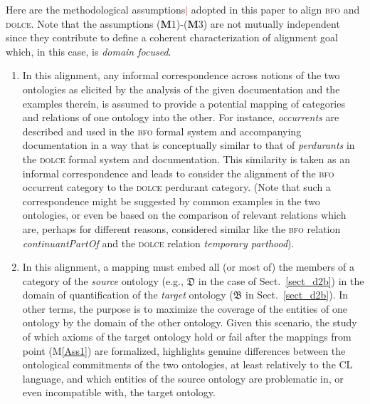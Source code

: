 \documentclass[ao]{iosart2x}
\newcommand{\nb}[1]{\textcolor{red}{$|$}\marginpar{\hspace*{-0cm}\parbox{20mm}{\scriptsize\raggedright\textcolor{red}{#1}}}}
\newcommand{\dolce}{{\textsc{dolce}}}
\newcommand{\bfo}{{\textsc{bfo}}}
\newcommand {\thdolce} {\ensuremath{\mathfrak{D}}}
\newcommand {\thbfo} {\ensuremath{\mathfrak{B}}}
\begin{document}
Here are the methodological assumptions\nb{SB: il termine "methodological assumptions" non mi piace molto} adopted in this paper to align {\bfo} and {\dolce}. Note that the assumptions ({\bf M}1)-({\bf M}3) are not mutually independent since they contribute to define a coherent characterization of alignment goal which, in this case, is {\em domain focused}. 
%
\begin{enumerate}[({\bf M}1)]
\item \label{Ass1} In this alignment, any informal correspondence across notions of the two ontologies as elicited by the analysis of the given documentation and the examples therein, is assumed to provide a potential mapping of categories and relations of one ontology into the other. 
For instance, \emph{occurrents} 
are described and used in the {\bfo} formal system and accompanying documentation in a way that is conceptually similar to that of \emph{perdurants} in the {\dolce} formal system and documentation.
This similarity is taken as an informal correspondence and leads to consider the alignment of the {\bfo} occurrent category to the {\dolce} perdurant category. (Note that such a correspondence might be suggested by common examples in the two ontologies, or even be based on the comparison of relevant relations which are, perhaps for different reasons, considered similar like the {\bfo} relation \emph{continuantPartOf} and the {\dolce} relation \emph{temporary parthood}). 

\item \label{Ass2} In this alignment, a mapping must embed all (or most of) the members of a category of the \emph{source} ontology (e.g., {$\thdolce$} in the case of Sect.~\ref{sect_d2b}) in the domain of quantification of the \emph{target} ontology ({$\thbfo$} in Sect.~\ref{sect_d2b}). In other terms, the purpose is to maximize the coverage of the entities of one ontology by the domain of the other ontology. 
Given this scenario, the study of which axioms of the target ontology hold or fail after the mappings from point (M\ref{Ass1}) are formalized, highlights genuine differences between the ontological commitments of the two ontologies, at least relatively to the CL language, and which entities of the source ontology are problematic in, or even incompatible with, the target ontology.   


\end{enumerate}
\end{document}
